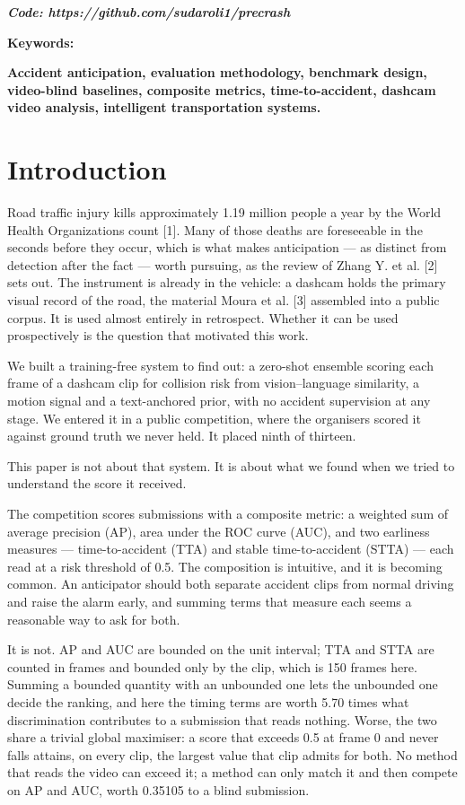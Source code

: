 \emph{\textbf{Code: https://github.com/sudaroli1/precrash}}

\textbf{Keywords:}

\textbf{Accident anticipation, evaluation methodology, benchmark design, video-blind baselines, composite metrics, time-to-accident, dashcam video analysis, intelligent transportation systems.}

\hypertarget{introduction}{%
\section{\texorpdfstring{\textbf{Introduction}}{Introduction}}\label{introduction}}

Road traffic injury kills approximately 1.19 million people a year by the World Health Organization\textquotesingle s count {[}1{]}. Many of those deaths are foreseeable in the seconds before they occur, which is what makes anticipation --- as distinct from detection after the fact --- worth pursuing, as the review of Zhang Y. et al. {[}2{]} sets out. The instrument is already in the vehicle: a dashcam holds the primary visual record of the road, the material Moura et al. {[}3{]} assembled into a public corpus. It is used almost entirely in retrospect. Whether it can be used prospectively is the question that motivated this work.

We built a training-free system to find out: a zero-shot ensemble scoring each frame of a dashcam clip for collision risk from vision--language similarity, a motion signal and a text-anchored prior, with no accident supervision at any stage. We entered it in a public competition, where the organisers scored it against ground truth we never held. It placed ninth of thirteen.

This paper is not about that system. It is about what we found when we tried to understand the score it received.

The competition scores submissions with a composite metric: a weighted sum of average precision (AP), area under the ROC curve (AUC), and two earliness measures --- time-to-accident (TTA) and stable time-to-accident (STTA) --- each read at a risk threshold of 0.5. The composition is intuitive, and it is becoming common. An anticipator should both separate accident clips from normal driving and raise the alarm early, and summing terms that measure each seems a reasonable way to ask for both.

It is not. AP and AUC are bounded on the unit interval; TTA and STTA are counted in frames and bounded only by the clip, which is 150 frames here. Summing a bounded quantity with an unbounded one lets the unbounded one decide the ranking, and here the timing terms are worth 5.70 times what discrimination contributes to a submission that reads nothing. Worse, the two share a trivial global maximiser: a score that exceeds 0.5 at frame 0 and never falls attains, on every clip, the largest value that clip admits for both. No method that reads the video can exceed it; a method can only match it and then compete on AP and AUC, worth 0.35105 to a blind submission.

